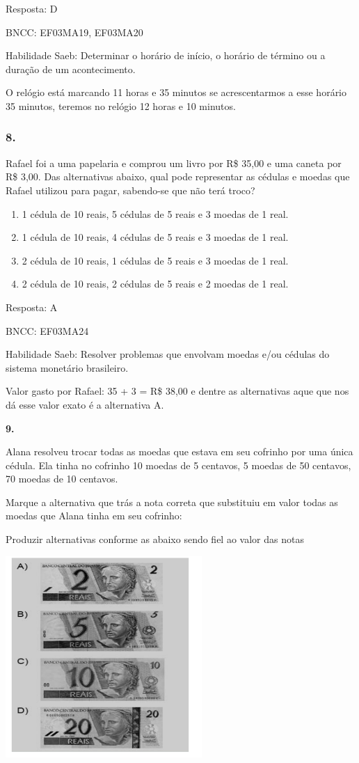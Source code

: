 Resposta: D

BNCC: EF03MA19, EF03MA20

Habilidade Saeb: Determinar o horário de início, o horário de término ou
a duração de um acontecimento.

O relógio está marcando 11 horas e 35 minutos se acrescentarmos a esse
horário 35 minutos, teremos no relógio 12 horas e 10 minutos.

\subsubsection{8. }\label{section-176}

Rafael foi a uma papelaria e comprou um livro por R\$ 35,00 e uma caneta
por R\$ 3,00. Das alternativas abaixo, qual pode representar as cédulas
e moedas que Rafael utilizou para pagar, sabendo-se que não terá troco?

\begin{enumerate}
\def\labelenumi{\alph{enumi})}
\item
  1 cédula de 10 reais, 5 cédulas de 5 reais e 3 moedas de 1 real.
\item
  1 cédula de 10 reais, 4 cédulas de 5 reais e 3 moedas de 1 real.
\item
  2 cédula de 10 reais, 1 cédulas de 5 reais e 3 moedas de 1 real.
\item
  2 cédula de 10 reais, 2 cédulas de 5 reais e 2 moedas de 1 real.
\end{enumerate}

Resposta: A

BNCC: EF03MA24

Habilidade Saeb: Resolver problemas que envolvam moedas e/ou cédulas do
sistema monetário brasileiro.

Valor gasto por Rafael: 35 + 3 = R\$ 38,00 e dentre as alternativas aque
que nos dá esse valor exato é a alternativa A.

\textbf{9.}

Alana resolveu trocar todas as moedas que estava em seu cofrinho por uma
única cédula. Ela tinha no cofrinho 10 moedas de 5 centavos, 5 moedas de
50 centavos, 70 moedas de 10 centavos.

Marque a alternativa que trás a nota correta que substituiu em valor
todas as moedas que Alana tinha em seu cofrinho:

Produzir alternativas conforme as abaixo sendo fiel ao valor das notas

\includegraphics[width=2.93590in,height=3.00930in]{media/image135.png}

